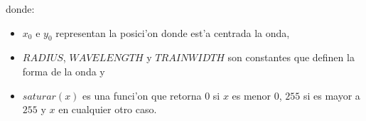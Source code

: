 donde:

\begin{itemize}
  \item $x_0$ e $y_0$ representan la posici'on donde est'a centrada la onda,
  \item $RADIUS$, $WAVELENGTH$ y $TRAINWIDTH$ son constantes que definen la 
  forma de la onda y
  \item $saturar(x)$ es una funci'on que retorna $0$ si $x$ es menor $0$, $255$
  si es mayor a $255$ y $x$ en cualquier otro caso.
\end{itemize}
